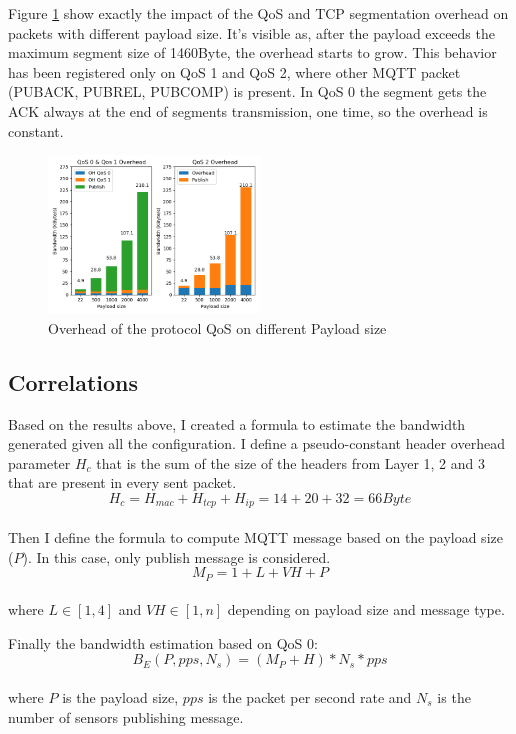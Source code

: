 \documentclass[journal]{IEEEtran}
\begin{document}
Figure \ref{fig:payload} show exactly the impact of the QoS and TCP segmentation overhead on packets with different payload size. It's visible as, after the payload exceeds the maximum segment size of 1460Byte, the overhead starts to grow. This behavior has been registered only on QoS 1 and QoS 2, where other MQTT packet (PUBACK, PUBREL, PUBCOMP) is present. In QoS 0 the segment gets the ACK always at the end of segments transmission, one time, so the overhead is constant. 

\begin{figure}[h]
	\centering
	\includegraphics[width=0.50\textwidth]{payload}
	\caption{Overhead of the protocol QoS on different Payload size}
	\label{fig:payload}
\end{figure}

\subsection{Correlations}
Based on the results above, I created a formula to estimate the bandwidth generated given all the configuration.
I define a pseudo-constant header overhead parameter $H_c$  that is the sum of the size of the headers from Layer 1, 2 and 3
that are present in every sent packet. 
\begin{equation}
H_c = H_{mac} + H_{tcp} + H_{ip} = 14 + 20 + 32 = 66 Byte
\end{equation}\\
Then I define the formula to compute MQTT message based on the payload size ($P$). In this case, only publish message is considered.
\begin{equation}
M_P = 1 + L + VH + P 
\end{equation}\\
where $L \in [1,4]$ and $VH \in [1, n] $ depending on payload size and message type.

Finally the bandwidth estimation based on QoS 0:
\begin{equation}
B_E (P, pps, N_s) = (M_P + H) * N_s * pps
\end{equation}\\
where $P$ is the payload size, $pps$ is the packet per second rate and $N_s$ is the number of sensors publishing message. 
\end{document}
